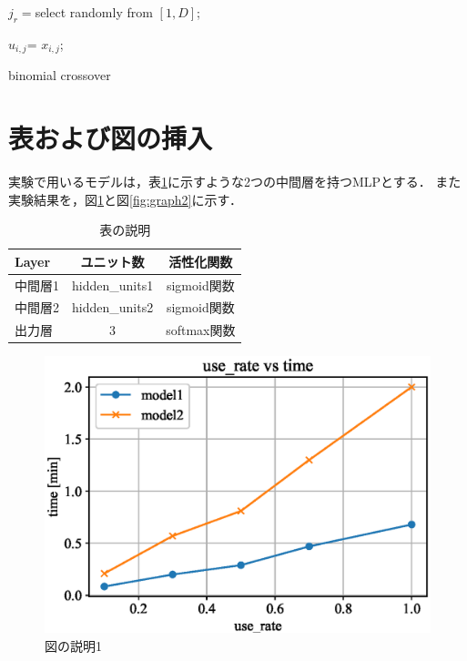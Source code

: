 \documentclass[twocolumn,10pt]{jarticle}
\begin{document}
\begin{algorithm}[htbp]
\DontPrintSemicolon
  
 $j_r=$select randomly from $[1,D]$;
 
   {
  
    {
    $u_{i,j}$=  $x_{i,j}$;
    }
   }

\caption{binomial crossover}         
\label{bin}   
\end{algorithm}




\section{表および図の挿入}
実験で用いるモデルは，表\ref{tbl:MLP}に示すような2つの中間層を持つMLPとする．
また実験結果を，図\ref{fig:graph1}と図\ref{fig:graph2}に示す．

\begin{table}[htbp]
\begin{center}
\caption{表の説明}
\label{tbl:MLP}
\begin{tabular}{|l|c|c|}
\hline
Layer     & ユニット数 & 活性化関数  \\ \hline
中間層1 & hidden\_units1   & sigmoid関数   \\ \hline
中間層2 & hidden\_units2   & sigmoid関数      \\ \hline
出力層 & 3    & softmax関数        \\ \hline
\end{tabular}
\end{center}
\end{table}


\begin{figure}[htbp]
  \centering
  \includegraphics[width=.9\linewidth]{fig/graph1.eps}
  \caption{図の説明1}
  \label{fig:graph1}
\end{figure}
\end{document}
